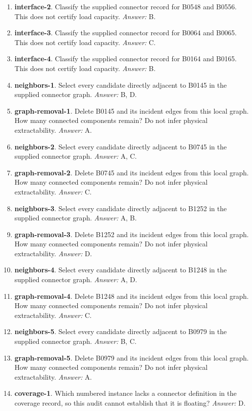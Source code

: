 \begin{enumerate}
\item \textbf{interface-2}. Classify the supplied connector record for B0548 and B0556. This does not certify load capacity. \textit{Answer:} B.
\item \textbf{interface-3}. Classify the supplied connector record for B0064 and B0065. This does not certify load capacity. \textit{Answer:} C.
\item \textbf{interface-4}. Classify the supplied connector record for B0164 and B0165. This does not certify load capacity. \textit{Answer:} B.
\item \textbf{neighbors-1}. Select every candidate directly adjacent to B0145 in the supplied connector graph. \textit{Answer:} B, D.
\item \textbf{graph-removal-1}. Delete B0145 and its incident edges from this local graph. How many connected components remain? Do not infer physical extractability. \textit{Answer:} A.
\item \textbf{neighbors-2}. Select every candidate directly adjacent to B0745 in the supplied connector graph. \textit{Answer:} A, C.
\item \textbf{graph-removal-2}. Delete B0745 and its incident edges from this local graph. How many connected components remain? Do not infer physical extractability. \textit{Answer:} C.
\item \textbf{neighbors-3}. Select every candidate directly adjacent to B1252 in the supplied connector graph. \textit{Answer:} A, B.
\item \textbf{graph-removal-3}. Delete B1252 and its incident edges from this local graph. How many connected components remain? Do not infer physical extractability. \textit{Answer:} D.
\item \textbf{neighbors-4}. Select every candidate directly adjacent to B1248 in the supplied connector graph. \textit{Answer:} A, D.
\item \textbf{graph-removal-4}. Delete B1248 and its incident edges from this local graph. How many connected components remain? Do not infer physical extractability. \textit{Answer:} C.
\item \textbf{neighbors-5}. Select every candidate directly adjacent to B0979 in the supplied connector graph. \textit{Answer:} B, C.
\item \textbf{graph-removal-5}. Delete B0979 and its incident edges from this local graph. How many connected components remain? Do not infer physical extractability. \textit{Answer:} A.
\item \textbf{coverage-1}. Which numbered instance lacks a connector definition in the coverage record, so this audit cannot establish that it is floating? \textit{Answer:} D.

\end{enumerate}
